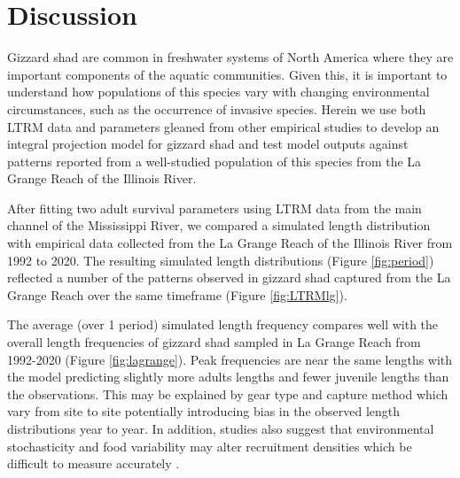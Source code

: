 \documentclass[preprint,review,12pt,authoryear]{elsarticle}
\begin{document}

\section{Discussion}
Gizzard shad are common in freshwater systems of North America where they are important components of the aquatic communities. 
Given this, it is important to understand how populations of this species vary with changing environmental circumstances, such as the occurrence of invasive species. 
Herein we use both LTRM data and parameters gleaned from other empirical studies to develop an integral projection model for gizzard shad and test model outputs against patterns reported from a well-studied population of this species from the La Grange Reach of the Illinois River.   

After fitting two adult survival parameters using LTRM data from the main channel of the Mississippi River, we compared a simulated length distribution with empirical data collected from the La Grange Reach of the Illinois River from 1992 to 2020. 
The resulting simulated length distributions (Figure \ref{fig:period}) reflected a number of the patterns observed in gizzard shad captured from the La Grange Reach over the same timeframe (Figure \ref{fig:LTRMlg}). 

The average (over 1 period) simulated length frequency compares well with the overall length frequencies of  gizzard shad sampled in La Grange Reach from 1992-2020 (Figure \ref{fig:lagrange}). 
Peak frequencies are near the same lengths with the model predicting slightly more adults lengths and fewer juvenile lengths than the observations. 
This may be explained by gear type and capture method which vary from site to site potentially introducing bias in the observed length distributions year to year.
In addition, studies also suggest that environmental stochasticity and food variability may alter recruitment densities which be difficult to measure accurately \citep{rose2000quantitative, okamoto2016stochastic}. 
\end{document}
